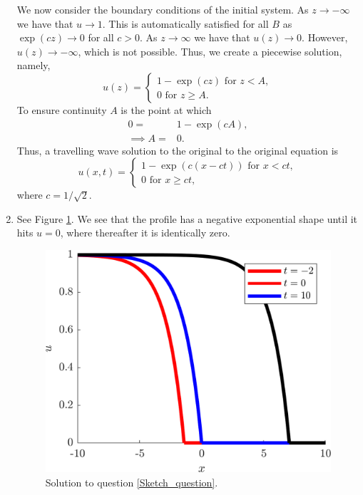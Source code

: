 \documentclass[10pt]{article}
\newcommand{\bb}{\begin{equation}}
\newcommand{\ee}{\end{equation}}
\newcommand{\fig}[1]{Figure \ref{#1}}
\newcommand{\ttp}{.45\textwidth}
\begin{document}
\begin{Answ}
\begin{enumerate}
We now consider the boundary conditions of the initial system. As $z\rightarrow-\infty$ we have that $u\rightarrow 1$. This is automatically satisfied for all $B$ as $\exp(cz)\rightarrow 0$ for all $c>0$. As $z\rightarrow \infty$ we have that $u(z)\rightarrow 0$. However, $u(z)\rightarrow-\infty$, which is not possible. Thus, we create a piecewise solution, namely,
\bb
u(z)=\left\{\begin{array}{l}1-\exp(cz)  \textrm{ for } z<A,\\0 \textrm{ for } z\geq A.\end{array}\right.
\ee
To ensure continuity $A$ is the point at which
\begin{align}
0=&1-\exp(cA),\\
\implies A=&0.
\end{align}
Thus, a travelling wave solution to the original to the original equation is
\bb
u(x,t)=\left\{\begin{array}{l}1-\exp(c(x-ct))  \textrm{ for } x<ct,\\0 \textrm{ for } x\geq ct,\end{array}\right.
\ee
where $c=1/\sqrt{2}$.
\item See \fig{Exponential_travelling_wave.png}. We see that the profile has a negative exponential shape until it hits $u=0$, where thereafter it is identically zero.
\begin{figure}[h!!!tb]
\centering 
\includegraphics[width=\ttp]{../../Pictures/Exponential_travelling_wave.png}
\caption{Solution to question \ref{Sketch_question}. \label{Exponential_travelling_wave.png}}
\end{figure}
\end{enumerate}
\end{Answ}
\end{document}
